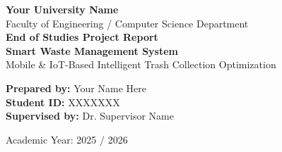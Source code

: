 \documentclass[12pt]{article}
\begin{document}
\thispagestyle{empty}

\begin{center}

{\Large \textbf{Your University Name}}\\[0.3cm]
{\large Faculty of Engineering / Computer Science Department}\\[1.5cm]


{\LARGE \textbf{End of Studies Project Report}}\\[0.8cm]

{\Huge \textbf{Smart Waste Management System}}\\[1.5cm]

{\large Mobile \& IoT-Based Intelligent Trash Collection Optimization}\\[2cm]

\end{center}

\begin{flushleft}
\textbf{Prepared by:} Your Name Here \\[0.3cm]
\textbf{Student ID:} XXXXXXX \\[0.3cm]
\textbf{Supervised by:} Dr. Supervisor Name \\[1cm]
\end{flushleft}

\vfill

\begin{center}
{\large Academic Year: 2025 / 2026}
\end{center}
\end{document}
